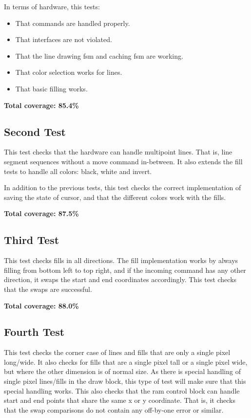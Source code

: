 \documentclass[]{article}
\begin{document}
In terms of hardware, this tests:
\begin{itemize}
	\item That commands are handled properly.
	\item That interfaces are not violated.
	\item That the line drawing fsm and caching fsm are working.
	\item That color selection works for lines.
	\item That basic filling works.
\end{itemize}

\textbf{Total coverage: 85.4\%}


\subsection{Second Test} %
\label{sub:second_test}
This test checks that the hardware can handle multipoint lines. That is, line segment sequences without a move command in-between. It also extends the fill tests to handle all colors: black, white and invert.

In addition to the previous tests, this test checks the correct implementation of saving the state of cursor, and that the different colors work with the fills.

\textbf{Total coverage: 87.5\%}


\subsection{Third Test} %
\label{sub:third_test}

This test checks fills in all directions. The fill implementation works by always filling from bottom left to top right, and if the incoming command has any other direction, it swaps the start and end coordinates accordingly. This test checks that the swaps are successful.

\textbf{Total coverage: 88.0\%}


\subsection{Fourth Test} %
\label{sub:fourth_test}

This test checks the corner case of lines and fills that are only a single pixel long/wide. It also checks for fills that are a single pixel tall or a single pixel wide, but where the other dimension is of normal size.
As there is special handling of single pixel lines/fills in the draw block, this type of test will make sure that this special handling works. This also checks that the ram control block can handle start and end points that share the same x or y coordinate. That is, it checks that the swap comparisons do not contain any off-by-one error or similar.
\end{document}

